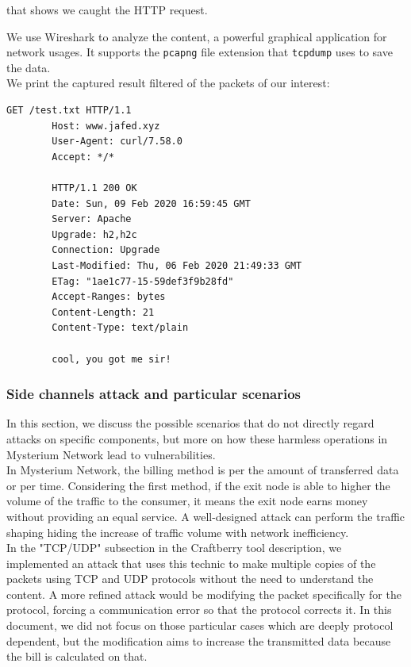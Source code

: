 \documentclass[12pt]{article}
\begin{document}
	that shows we caught the HTTP request.
	
	We use Wireshark to analyze the content, a powerful graphical application for network usages. It supports the \lstinline{pcapng} file extension that \lstinline{tcpdump} uses to save the data.\\
	We print the captured result filtered of the packets of our interest:\\
	
	\begin{lstlisting}[frame=single]
		GET /test.txt HTTP/1.1
		Host: www.jafed.xyz
		User-Agent: curl/7.58.0
		Accept: */*

		HTTP/1.1 200 OK
		Date: Sun, 09 Feb 2020 16:59:45 GMT
		Server: Apache
		Upgrade: h2,h2c
		Connection: Upgrade
		Last-Modified: Thu, 06 Feb 2020 21:49:33 GMT
		ETag: "1ae1c77-15-59def3f9b28fd"
		Accept-Ranges: bytes
		Content-Length: 21
		Content-Type: text/plain

		cool, you got me sir!
	\end{lstlisting}

	\subsubsection{Side channels attack and particular scenarios}
	In this section, we discuss the possible scenarios that do not directly regard attacks on specific components, but more on how these harmless operations in Mysterium Network lead to vulnerabilities.\\
	In Mysterium Network, the billing method is per the amount of transferred data or per time. Considering the first method, if the exit node is able to higher the volume of the traffic to the consumer, it means the exit node earns money without providing an equal service. A well-designed attack can perform the traffic shaping hiding the increase of traffic volume with network inefficiency.\\
	In the "TCP/UDP" subsection in the Craftberry tool description, we implemented an attack that uses this technic to make multiple copies of the packets using TCP and UDP protocols without the need to understand the content. A more refined attack would be modifying the packet specifically for the protocol, forcing a communication error so that the protocol corrects it. In this document, we did not focus on those particular cases which are deeply protocol dependent, but the modification aims to increase the transmitted data because the bill is calculated on that.\\
	\bigbreak
\end{document}
